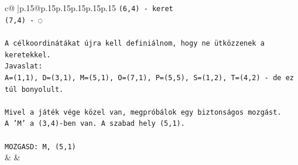 \documentclass{article}
\begin{document}
{\begin{supertabular}{c@{$\;$}|p{.15\linewidth}@{}p{.15\linewidth}p{.15\linewidth}p{.15\linewidth}p{.15\linewidth}p{.15\linewidth}}
{{{\texttt{(6,4) {-} keret} \\
\texttt{(7,4) {-} ◌} \\
\\ 
\texttt{A célkoordinátákat újra kell definiálnom, hogy ne ütközzenek a keretekkel.} \\
\texttt{Javaslat:} \\
\texttt{A=(1,1), D=(3,1), M=(5,1), O=(7,1), P=(5,5), S=(1,2), T=(4,2) {-} de ez túl bonyolult.} \\
\\ 
\texttt{Mivel a játék vége közel van, megpróbálok egy biztonságos mozgást.} \\
\texttt{A 'M' a (3,4){-}ben van. A szabad hely (5,1).} \\
\\ 
\texttt{MOZGASD: M, (5,1)} \\
            }
        }
    }
    & & \\ \\


\end{supertabular}}
\end{document}
